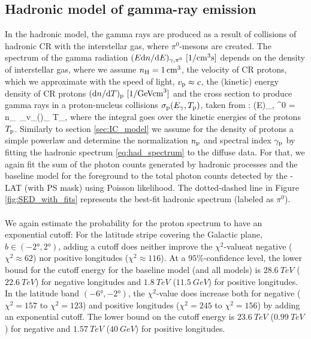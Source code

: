 \subsection{Hadronic model of gamma-ray emission}
\label{sec:Pion_model}

In the hadronic model, the gamma rays are produced as a result of collisions of hadronic CR with the interstellar gas, where $\pi^0$-mesons are created.
The spectrum of the gamma radiation $(E \de n / \de E)_{\gamma,\pi^0}\ [\SI{}{1/cm^3s}]$ depends on the density of interstellar gas, where we assume $n_{\text{H}} = \SI{1}{/cm^3}$, the velocity of CR protons, which we approximate with the speed of light, $v_{\text{p}} \approx c$, the (kinetic) energy density of CR protons $(\text{d} n / \text{d} T)_{\text{p}}\ [\SI{}{1/GeVcm^3}]$ and the cross section to produce gamma rays in a proton-nucleus collisions $\sigma_{\text{p}} (E_\gamma, T_{\text{p}})$, taken from :
\be
\left(E\right)_{\!\!\gamma, \pi^0}\! = \int n_\Hy\ \sigma_\pr v_\pr \left(\right)_{\!\!\pr} \de T_\pr,
\label{eq:had_spectrum}
\ee
where the integral goes over the kinetic energies of the protons $T_{\text{p}}$. Similarly to section \ref{sec:IC_model} we assume for the density of protons a simple powerlaw and determine the normalization $n_{\text{p}}$ and spectral index $\gamma_{\text{p}}$  by fitting the hadronic spectrum \eqref{eq:had_spectrum} to the diffuse \Fermi data. For that, we again fit the sum of the photon counts generated by hadronic processes and the baseline model for the foreground to the total photon counts detected by the \Fermi-LAT (with PS mask) using Poisson likelihood.  The dotted-dashed line in Figure \ref{fig:SED_with_fits} represents the best-fit hadronic spectrum (labeled as $\pi^0$).\\
\\
We again estimate the probability for the proton spectrum to have an exponential cutoff: For the latitude stripe covering the Galactic plane, $b \in (-\ang{2}, \ang{2})$, adding a cutoff does neither improve the $\chi^2$-valueat negative ($\chi^2 \approx 62$) nor positive longitudes ($\chi^2 \approx 116$). At a $95\%$-confidence level, the lower bound for the cutoff energy for the baseline model (and all models) is $\SI{28.6}{TeV}$ ($\SI{22.6}{TeV}$) for negative longitudes and $\SI{1.8}{TeV}$ ($\SI{11.5}{GeV}$) for positive longitudes.\\
In the latitude band $(-\ang{6}, -\ang{2})$, the $\chi^2$-value does increase both for negative ($\chi^2 = 157$ to $\chi^2 = 123$) and positive longitudes ($\chi^2 = 245$ to $\chi^2 = 156$) by adding an exponential cutoff. The lower bound on the cutoff energy is $\SI{23.6}{TeV}$ ($\SI{0.99}{TeV}$) for negative and $\SI{1.57}{TeV}$ ($\SI{40}{GeV}$) for positive longitudes.